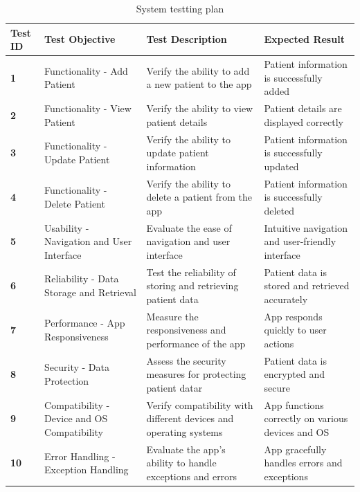 \documentclass[12pt]{article}
\begin{document}
				\begin{table}[!h]
				\centering
				\caption{System testting plan}
				\begin{tabular}{|p{1cm}|p{4cm}|p{4cm}|p{4cm}|}
					\hline
					\rowcolor{lightgray}
					\textbf{Test ID} & \textbf{Test Objective} &\textbf{Test Description} & \textbf{Expected Result} \\
					\hline
					\cellcolor{lightgray}\textbf{1} & Functionality - Add Patient & Verify the ability to add a new patient to the app & Patient information is successfully added\\
					\hline
					\cellcolor{lightgray}\textbf{2} & Functionality - View Patient & Verify the ability to view patient details & Patient details are displayed correctly\\
					\hline
					\cellcolor{lightgray}\textbf{3} & Functionality - Update Patient & Verify the ability to update patient information & Patient information is successfully updated \\
					\hline
					\cellcolor{lightgray}\textbf{4} & Functionality - Delete Patient & Verify the ability to delete a patient from the app & Patient information is successfully deleted \\
					\hline
					\cellcolor{lightgray}\textbf{5} & Usability - Navigation and User Interface & Evaluate the ease of navigation and user interface & Intuitive navigation and user-friendly interface \\
					\hline
					\cellcolor{lightgray}\textbf{6} & Reliability - Data Storage and Retrieval & Test the reliability of storing and retrieving patient data & Patient data is stored and retrieved accurately\\
					\hline
					\cellcolor{lightgray}\textbf{7} & Performance - App Responsiveness & Measure the responsiveness and performance of the app & App responds quickly to user actions\\
					\hline
					\cellcolor{lightgray}\textbf{8} & Security - Data Protection & Assess the security measures for protecting patient datar & Patient data is encrypted and secure\\
					\hline
					\cellcolor{lightgray}\textbf{9} & Compatibility - Device and OS Compatibility & Verify compatibility with different devices and operating systems & App functions correctly on various devices and OS\\
					\hline
					\cellcolor{lightgray}\textbf{10} & Error Handling - Exception Handling & Evaluate the app's ability to handle exceptions and errors & App gracefully handles errors and exceptions\\
					\hline
				\end{tabular}
			\end{table}
		\newpage
\end{document}
